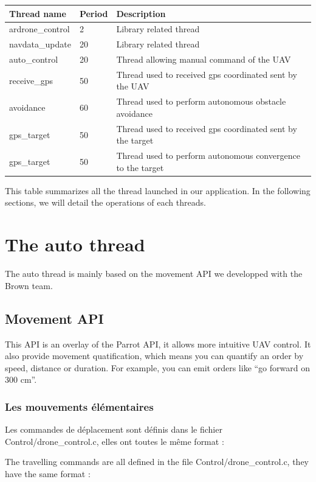 \newpage{}

\begin{tabular}{|l|l|l|}
    \hline
    Thread name & Period & Description \tabularnewline
    \hline
    ardrone\_control & 2 & Library related thread \tabularnewline
    \hline
    navdata\_update & 20 & Library related thread \tabularnewline
    \hline
    auto\_control & 20 & Thread allowing manual command of the UAV \tabularnewline
    \hline
    receive\_gps & 50 & Thread used to received gps coordinated sent by the UAV  \tabularnewline
    \hline
    avoidance & 60    & Thread used to perform autonomous obstacle avoidance   \tabularnewline
    \hline
    gps\_target & 50 & Thread used to received gps coordinated sent by the target  \tabularnewline
    \hline
    gps\_target & 50 & Thread used to perform autonomous convergence to the target  \tabularnewline
    \hline

 \end{tabular}

This table summarizes all the thread launched in our application. In the following sections, we will detail the operations of each threads.

\section{The auto thread}

The auto thread is mainly based on the movement API we developped with the Brown team.\\

\subsection{Movement API}

This API is an overlay of the Parrot API, it allows more intuitive UAV control. It also provide movement quatification, which means you can quantify an order by speed, distance or duration. For example, you can emit orders like ``go forward on 300 cm''.

\subsubsection{Les mouvements élémentaires}

Les commandes de déplacement sont définis dans le fichier Control/drone\_control.c, elles ont toutes le même format :

The travelling commands are all defined in the file Control/drone\_control.c, they have the same format :\\

